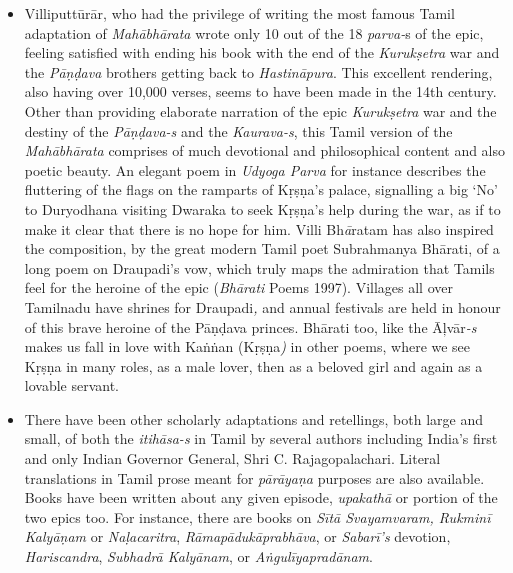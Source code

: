 \begin{itemize}
 \item Villiputtūrār, who had the privilege of writing the most famous Tamil adaptation of \textit{Mahābhārata} wrote only 10 out of the 18 \textit{parva-}s of the epic, feeling satisfied with ending his book with the end of the \textit{Kurukṣetra} war and the \textit{Pāṇḍava} brothers getting back to \textit{Hastināpura}. This excellent rendering, also having over 10,000 verses, seems to have been made in the 14th century. Other than providing elaborate narration of the epic \textit{Kurukṣetra} war and the destiny of the \textit{Pāṇḍava-s} and the \textit{Kaurava-s}, this Tamil version of the \textit{Mahābhārata} comprises of much devotional and philosophical content and also poetic beauty. An elegant poem in \textit{Udyoga Parva} for instance describes the fluttering of the flags on the ramparts of Kṛṣṇa’s palace, signalling a big ‘No’ to Duryodhana visiting Dwaraka to seek Kṛṣṇa’s help during the war, as if to make it clear that there is no hope for him. Villi Bh\textit{ā}ratam has also inspired the composition, by the great modern Tamil poet Subrahmanya Bhārati, of a long poem on Draupadi’s vow, which truly maps the admiration that Tamils feel for the heroine of the epic (\textit{Bhārati} Poems 1997). Villages all over Tamilnadu have shrines for Draupadi\textit{,} and annual festivals are held in honour of this brave heroine of the Pāṇḍava princes. Bhārati too, like the Āļvār\textit{-s} makes us fall in love with Kaṅṅan (Kṛṣṇa\textit{)} in other poems, where we see Kṛṣṇa in many roles, as a male lover, then as a beloved girl and again as a lovable servant.

 \item There have been other scholarly adaptations and retellings, both large and small, of both the \textit{itihāsa-s} in Tamil by several authors including India’s first and only Indian Governor General, Shri C. Rajagopalachari. Literal translations in Tamil prose meant for \textit{pārāyaṇa} purposes are also available. Books have been written about any given episode, \textit{upakathā} or portion of the two epics too. For instance, there are books on \textit{Sītā Svayamvaram, Rukminī Kalyāṇam} or \textit{Naḷacaritra}, \textit{Rāmapādukāprabhāva}, or \textit{Sabarī’s} devotion, \textit{Hariscandra}, \textit{Subhadrā Kalyānam}, or \textit{Aṅgulīyapradānam}.

\end{itemize}


